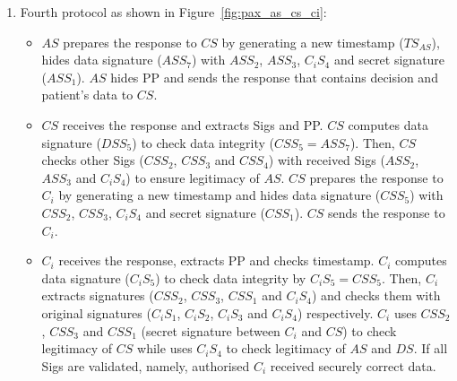 \documentclass[journal,article,submit,moreauthors,pdftex]{Definitions/mdpi}
\makeatletter
\newcommand\notsotiny{\@setfontsize\notsotiny{6.31415}{7.1828}}
\makeatother
\begin{document}
\begin{itemize}
\begin{itemize}[topsep=0pt,itemsep=-1ex,partopsep=1ex,parsep=1ex]
\begin{itemize} [topsep=0pt,itemsep=-1ex,partopsep=1ex,parsep=1ex]
\begin{enumerate}
\begin{figure}[ht]
	\caption{Protocol of PAX model between $AS$ and $DS$.}
	\label{fig:pax_as_ds}
\end{figure}
\item Fourth protocol as shown in Figure~\ref{fig:pax_as_cs_ci}:
\begin{itemize}
\item $AS$ prepares the response to $CS$ by generating a new timestamp ($TS_{AS}$), hides data signature ($ASS_7$) with $ASS_2$, $ASS_3$, $C_iS_4$ and secret signature ($ASS_1$). $AS$ hides PP and sends the response that contains decision and patient's data to $CS$.
\item $CS$ receives the response and extracts Sigs and PP. $CS$ computes data signature ($DSS_5$) to check data integrity ($CSS_5=ASS_7$). Then, $CS$ checks other Sigs ($CSS_2$, $CSS_3$ and $CSS_4$) with received Sigs ($ASS_2$, $ASS_3$ and $C_iS_4$) to ensure legitimacy of $AS$. $CS$ prepares the response to $C_i$ by generating a new timestamp and hides data signature ($CSS_5$) with $CSS_2$, $CSS_3$, $C_iS_4$ and secret signature ($CSS_1$). $CS$ sends the response to $C_i$.
\item $C_i$ receives the response, extracts PP and checks timestamp. $C_i$ computes data signature ($C_iS_5$) to check data integrity by $C_iS_5=CSS_5$. Then, $C_i$ extracts signatures ($CSS_2$, $CSS_3$, $CSS_1$ and $C_iS_4$) and checks them with original signatures ($C_iS_1$, $C_iS_2$, $C_iS_3$ and $C_iS_4$) respectively. $C_i$ uses $CSS_2$, $CSS_3$ and $CSS_1$ (secret signature between $C_i$ and $CS$) to check legitimacy of $CS$ while uses $C_iS_4$ to check legitimacy of $AS$ and $DS$. If all Sigs are validated, namely, authorised $C_i$ received securely correct data.
\end{itemize}
\begin{figure}[t]
\centering
\scriptsize
{}
\end{figure}
\end{enumerate}
\end{itemize}
\end{itemize}
\end{itemize}
\end{document}
